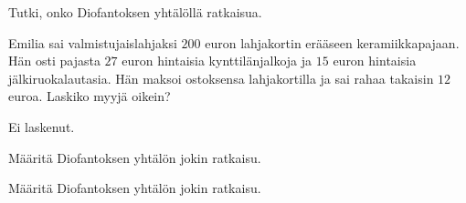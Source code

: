 \begin{kotitehtavasivu}

\begin{tehtava}
    Tutki, onko Diofantoksen yhtälöllä ratkaisua.
    
    \begin{alakohdat}
    \end{alakohdat}

    \begin{vastaus}
        \begin{alakohdat}
        \end{alakohdat}
    \end{vastaus}
    
\end{tehtava}

\begin{tehtava}
    Emilia sai valmistujaislahjaksi $200$ euron lahjakortin erääseen keramiikkapajaan. Hän osti pajasta $27$ euron hintaisia kynttilänjalkoja ja $15$ euron hintaisia jälkiruokalautasia. Hän maksoi ostoksensa lahjakortilla ja sai rahaa takaisin $12$ euroa. Laskiko myyjä oikein?
    
    \begin{vastaus}
        Ei laskenut.
    \end{vastaus}
    
\end{tehtava}

\begin{tehtava}
    Määritä Diofantoksen yhtälön jokin ratkaisu.

    \begin{alakohdat}
    \end{alakohdat}
    
    \begin{vastaus}
        \begin{alakohdat}
        \end{alakohdat}
    \end{vastaus}
    
\end{tehtava}

\begin{tehtava}
    Määritä Diofantoksen yhtälön jokin ratkaisu.


\end{tehtava}
\end{kotitehtavasivu}
